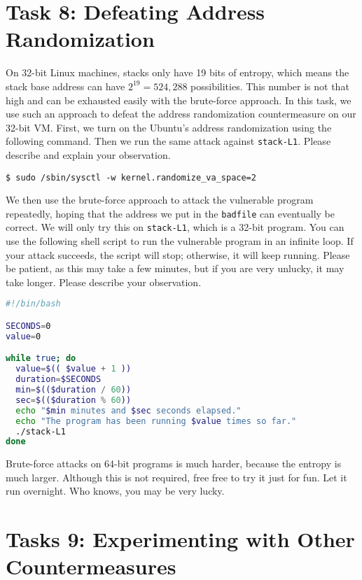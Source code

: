 \section{Task 8: Defeating Address Randomization}

On 32-bit Linux machines, stacks only have 19 bits of entropy, which means the stack base
address can have $2^{19} = 524,288$ possibilities.  This number is not that high and can be
exhausted easily with the brute-force approach. In this task,
we use such an approach to defeat the address randomization countermeasure 
on our 32-bit VM. 
First, we turn on the Ubuntu's address randomization using the 
following command. Then we run the same attack
against \texttt{stack-L1}.
Please describe and explain your observation.

\begin{lstlisting}
$ sudo /sbin/sysctl -w kernel.randomize_va_space=2
\end{lstlisting}


We then use the brute-force approach to attack the vulnerable program repeatedly, hoping that 
the address we put in the \texttt{badfile} can eventually be correct. We will only try
this on \texttt{stack-L1}, which is a 32-bit program. 
You can use the following shell script to run the vulnerable program in an infinite loop. If your
attack succeeds, the script will stop; otherwise, it will keep running. Please be patient,
as this may take a few minutes, but if you are very unlucky,
it may take longer. Please describe your observation.


\begin{lstlisting}[language=bash]
#!/bin/bash

SECONDS=0
value=0

while true; do
  value=$(( $value + 1 ))
  duration=$SECONDS
  min=$(($duration / 60))
  sec=$(($duration % 60))
  echo "$min minutes and $sec seconds elapsed."
  echo "The program has been running $value times so far."
  ./stack-L1
done
\end{lstlisting}


Brute-force attacks on 64-bit programs is much harder, because the entropy
is much larger. Although this is not required, free free to try it just for fun. 
Let it run overnight. Who knows, you may be very lucky. 


\section{Tasks 9: Experimenting with Other Countermeasures}



